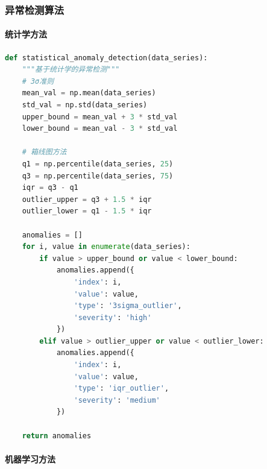 \subsubsection{异常检测算法}\label{ux5f02ux5e38ux68c0ux6d4bux7b97ux6cd5}

\paragraph{统计学方法}\label{ux7edfux8ba1ux5b66ux65b9ux6cd5}

\begin{lstlisting}[language=Python]
def statistical_anomaly_detection(data_series):
    """基于统计学的异常检测"""
    # 3σ准则
    mean_val = np.mean(data_series)
    std_val = np.std(data_series)
    upper_bound = mean_val + 3 * std_val
    lower_bound = mean_val - 3 * std_val
    
    # 箱线图方法
    q1 = np.percentile(data_series, 25)
    q3 = np.percentile(data_series, 75)
    iqr = q3 - q1
    outlier_upper = q3 + 1.5 * iqr
    outlier_lower = q1 - 1.5 * iqr
    
    anomalies = []
    for i, value in enumerate(data_series):
        if value > upper_bound or value < lower_bound:
            anomalies.append({
                'index': i,
                'value': value,
                'type': '3sigma_outlier',
                'severity': 'high'
            })
        elif value > outlier_upper or value < outlier_lower:
            anomalies.append({
                'index': i,
                'value': value,
                'type': 'iqr_outlier',
                'severity': 'medium'
            })
    
    return anomalies
\end{lstlisting}

\paragraph{机器学习方法}\label{ux673aux5668ux5b66ux4e60ux65b9ux6cd5}

